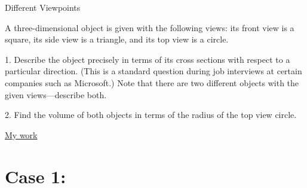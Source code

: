 \documentclass[12pt]{article}
\begin{document}
\begin{center}

{\Large Different Viewpoints} 

\end{center}

\vspace*{.2in}


\noindent  
A three-dimensional object is given with the following views: its front view is a square, its side view is a triangle, and its top view is a circle.

1.  Describe the object precisely in terms of its cross sections with respect to a particular direction.  (This is a standard question during job interviews at certain companies such as Microsoft.)  Note that there are two different objects with the given views---describe both.

2.  Find the volume of both objects in terms of the radius of the top view circle.


\newpage

\begin{center}
\underline {\Large {My work} }
\end{center}

\section*{Case 1:}
    
\end{document}
